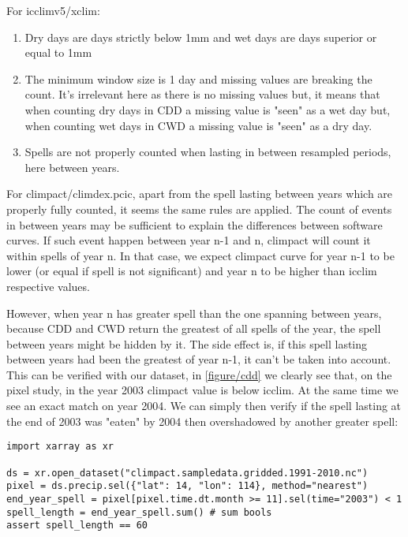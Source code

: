 \documentclass[a4paper,11pt]{article}
\begin{document}
        For icclimv5/xclim:
        \begin{enumerate}
            \item Dry days are days strictly below 1mm and wet days are days superior or equal to 1mm
            \item The minimum window size is 1 day and missing values are breaking the count. 
                It's irrelevant here as there is no missing values but, it means that when counting dry days in CDD a missing value is "seen" as a wet day but, when counting wet days in CWD a missing value is "seen" as a dry day.
            \item Spells are not properly counted when lasting in between resampled periods, here between years.
        \end{enumerate}

        For climpact/climdex.pcic, apart from the spell lasting between years which are properly fully counted, it seems the same rules are applied.
        The count of events in between years may be sufficient to explain the differences between software curves.
        If such event happen between year n-1 and n, climpact will count it within spells of year n.
        In that case, we expect climpact curve for year n-1 to be lower (or equal if spell is not significant) and year n to be higher than icclim respective values.
        
        However, when year n has greater spell than the one spanning between years, because CDD and CWD return the greatest of all spells of the year, the spell between years
        might be hidden by it. The side effect is, if this spell lasting between years had been the greatest of year n-1, it can't be taken into account.
        This can be verified with our dataset, in \ref{figure/cdd} we clearly see that, on the pixel study, in the year 2003 climpact value is below icclim.
        At the same time we see an exact match on year 2004.
        We can simply then verify if the spell lasting at the end of 2003 was "eaten" by 2004 then overshadowed by another greater spell:
    
        \begin{minipage}{\linewidth}
        \begin{lstlisting}
import xarray as xr

ds = xr.open_dataset("climpact.sampledata.gridded.1991-2010.nc")
pixel = ds.precip.sel({"lat": 14, "lon": 114}, method="nearest")
end_year_spell = pixel[pixel.time.dt.month >= 11].sel(time="2003") < 1
spell_length = end_year_spell.sum() # sum bools
assert spell_length == 60
        \end{lstlisting}
        \end{minipage}
\end{document}
